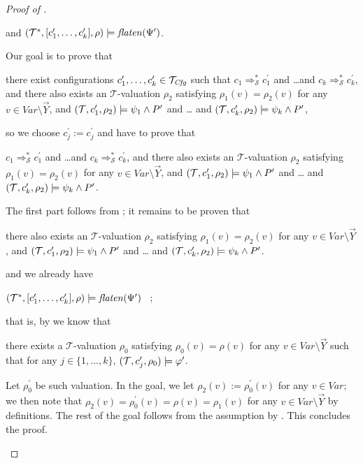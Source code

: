 \begin{proof}[Proof of ]
\begin{enumerate}
\begin{proofenv}
        and $(\mathcal{T}^*, [c^\prime_1,\ldots,c^\prime_k], \rho) \models \mathit{flaten}(\Psi^\prime)$.
    \end{proofenv}
    Our goal is to prove that
    \begin{proofenv}
        there exist configurations $c_1^\prime,\ldots,c_k^\prime \in \mathcal{T}_{\mathit{Cfg}}$
        such that $c_1 \Rightarrow^{*}_{\mathcal{S}} c_1^\prime$
        and \ldots and $c_k \Rightarrow^{*}_{\mathcal{S}} c_k^\prime$,
        and there also exists an $\mathcal{T}$-valuation $\rho_2$
        satisfying $\rho_1(v) = \rho_2(v)$ for any $v \in \mathit{Var} \setminus \vec{Y}$,
        and
        $(\mathcal{T}, c_1^\prime,\rho_2) \models \psi_1 \land P^\prime$ and \ldots
        and $(\mathcal{T}, c_k^\prime, \rho_2) \models \psi_k \land P^\prime$,
    \end{proofenv}
    so we choose $c^\prime_j := c^\prime_j$ and have to prove that
    \begin{proofenv}
        $c_1 \Rightarrow^{*}_{\mathcal{S}} c_1^\prime$
        and \ldots and $c_k \Rightarrow^{*}_{\mathcal{S}} c_k^\prime$,
        and there also exists an $\mathcal{T}$-valuation $\rho_2$
        satisfying $\rho_1(v) = \rho_2(v)$ for any $v \in \mathit{Var} \setminus \vec{Y}$,
        and
        $(\mathcal{T}, c_1^\prime,\rho_2) \models \psi_1 \land P^\prime$ and \ldots
        and $(\mathcal{T}, c_k^\prime, \rho_2) \models \psi_k \land P^\prime$.
    \end{proofenv}
    The first part follows from ;
    it remains to be proven that
    \begin{proofenv}
        there also exists an $\mathcal{T}$-valuation $\rho_2$
        satisfying $\rho_1(v) = \rho_2(v)$ for any $v \in \mathit{Var} \setminus \vec{Y}$,
        and
        $(\mathcal{T}, c_1^\prime,\rho_2) \models \psi_1 \land P^\prime$ and \ldots
        and $(\mathcal{T}, c_k^\prime, \rho_2) \models \psi_k \land P^\prime$.
    \end{proofenv}
    and we already have
    \begin{proofenv}
        $(\mathcal{T}^*, [c^\prime_1,\ldots,c^\prime_k], \rho) \models \mathit{flaten}(\Psi^\prime)$ \, ;
    \end{proofenv}
    that is, by  we know that
    \begin{proofenv}
        there exists a $\mathcal{T}$-valuation $\rho_0$ satisfying $\rho_0(v) = \rho(v)$
        for any $v \in \mathit{Var} \setminus \vec{Y}$ such that for any $j \in \{ 1, \ldots, k \}$,
        $(\mathcal{T}, c^\prime_j, \rho_0) \models \varphi^\prime$.
    \end{proofenv}
    Let $\rho_0^\prime$ be such valuation.
    In the goal, we let $\rho_2(v) := \rho_0^\prime(v)$ for any $v \in \mathit{Var}$;
    we then note that $\rho_2(v) = \rho_0^\prime(v) =  \rho(v) =  \rho_1(v)$ for any $v \in \mathit{Var} \setminus \vec{Y}$ by definitions.
    The rest of the goal follows from the assumption by .
    This concludes the proof.
\end{enumerate}
\end{proof}

